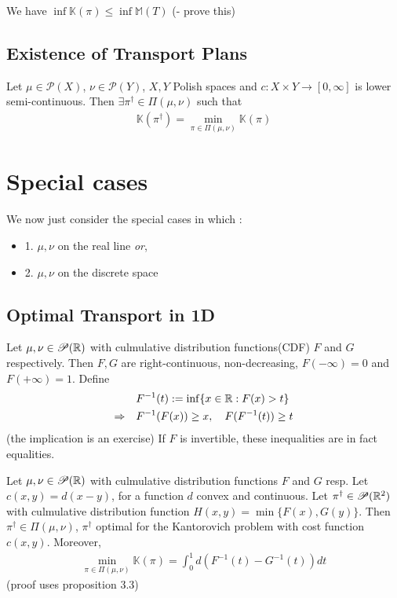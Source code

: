 \documentclass[10pt,a4paper]{article}
\renewenvironment{i}
{\begin{itemize} 
	}%
	{\end{itemize}
}
\begin{document}
We have $\inf \mathbb{K}(\pi) \leq \inf \mathbb{M}(T)$ (- prove this)
\s

\subsection{Existence of Transport Plans}

  Let $\mu \in \mathscr{P}(X)$, $\nu \in \mathscr{P}(Y)$, $X, Y$ Polish spaces and $c: X\times Y \rightarrow [0, \infty]$ is lower semi-continuous. Then $\exists \pi^{\dagger} \in \Pi(\mu, \nu)$ such that
\begin{align*}
\mathbb{K}(\pi^{\dagger}) = \min_{\pi \in \Pi(\mu, \nu)}\mathbb{K}(\pi)
\end{align*}

\section{Special cases}
We  now just consider the special cases in which :
\begin{i}
\item[1.] $\mu, \nu$ on the real line \emph{or},
\item[2.] $\mu, \nu$ on the discrete space
\end{i}

\subsection{Optimal Transport in 1D}

Let $\mu, \nu\in \mathscr{P}(\mathbb{R})$ with culmulative distribution functions(CDF) $F$ and $G$ respectively.  Then $F,G$ are right-continuous, non-decreasing, $F(-\infty) =0$ and $F(+\infty) =1$. Define
\begin{align*}
&F^{-1}(t) : = \inf \{x\in \mathbb{R} : F(x)>t \}\\
\Rightarrow \quad & F^{-1}(F(x)) \geq x, \quad F(F^{-1}(t))\geq t
\end{align*}
(the implication is an exercise) If $F$ is invertible, these inequalities are in fact equalities.
\s

 Let $\mu, \nu \in \mathscr{P}(\mathbb{R})$ with culmulative distribution functions $F$ and $G$ resp. Let $c(x,y)= d(x-y)$, for a function $d$ convex and continuous. Let $\pi^{\dagger} \in \mathscr{P}(\mathbb{R}^2)$ with culmulative distribution function $H(x,y) = \min\{F(x), G(y)\}$. Then $\pi^{\dagger} \in \Pi(\mu, \nu)$, $\pi^{\dagger}$ optimal for the Kantorovich problem with cost function $c(x,y)$. Moreover,
\begin{align*}
\min_{\pi \in \Pi(\mu, \nu)}\mathbb{K}(\pi ) =\int_0^1 d(F^{-1}(t) - G^{-1}(t))dt
\end{align*}
(proof uses proposition 3.3)
\s
\end{document}
